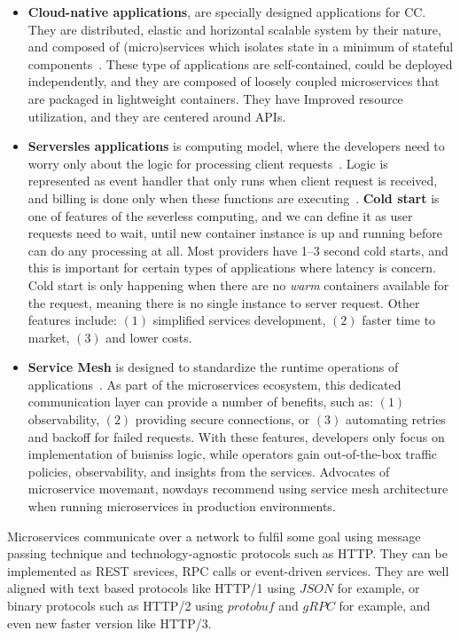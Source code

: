 \begin{itemize}
	\item \textbf{Cloud-native applications}, are specially designed applications for CC. They are distributed, elastic and horizontal scalable system by their nature, and composed of (micro)services which isolates state in a minimum of stateful components~\cite{KratzkeQ17}. These type of applications are self-contained, could be deployed independently, and they are composed of loosely coupled microservices that are packaged in lightweight containers. They have Improved resource utilization, and they are centered around APIs.
	\item \textbf{Serversles applications} is computing model, where the developers need to worry only about the logic for processing client requests~\cite{AdzicC17}. Logic is represented as event handler that only runs when client request is received, and billing is done only when these functions are executing~\cite{AdzicC17}. \textbf{Cold start} is one of features of the severless computing, and we can define it as user requests need to wait, until new container instance is up and running before can do any processing at all. Most providers have 1–3 second cold starts, and this is important for certain types of applications where latency is concern. Cold start is only happening when there are no \textit{warm} containers available for the request, meaning there is no single instance to server request. Other features include: $(1)$ simplified services development, $(2)$ faster time to market, $(3)$ and lower costs.
	\item \textbf{Service Mesh} is designed to standardize the runtime operations of applications~\cite{LiLGZH19}. As part of the microservices ecosystem,
	this dedicated communication layer can provide a number of benefits, such as: $(1)$ observability, $(2)$ providing secure connections, or $(3)$ automating retries and backoff for failed requests. With these features, developers only focus on implementation of buisniss logic, while operators gain out-of-the-box traffic policies, observability, and insights from the services. Advocates of microservice movemant, nowdays recommend using service mesh architecture when running microservices in production environments.
\end{itemize}

Microservices communicate over a network to fulfil some goal using message passing technique and technology-agnostic protocols such as HTTP. They can be implemented as REST srevices, RPC calls or event-driven services. They are well aligned with text based protocols like HTTP/1 using $JSON$ for example, or binary protocols such as HTTP/2 using $protobuf$ and $gRPC$ for example, and even new faster version like HTTP/3.

